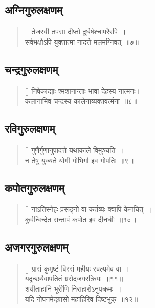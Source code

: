 \documentclass[twoside,12pt,notitlepage]{book}
\begin{document}
\subsection*{अग्निगुरुलक्षणम् }
\begin{verse}[\versewidth]
तेजस्वी तपसा दीप्तो दुर्धर्षश्चापरैरपि~।\\[-6pt]
सर्वभक्षोऽपि युक्तात्मा नादत्ते मलमग्निवत्~॥७॥\footA 
\end{verse}

\subsection*{चन्द्रगुरुलक्षणम्}
\begin{verse}[\versewidth]
निषेकाद्याः श्मशानान्ताः भावा देहस्य नात्मनः।\\[-6pt]
कलानामिव चन्द्रस्य कालेनाव्यक्तवर्त्मना~॥८॥\footA 
\end{verse}

\subsection*{रविगुरुलक्षणम् }
\begin{verse}[\versewidth]
गुणैर्गुणानुपादत्ते यथाकाले विमुञ्चति~।\\[-6pt]
न तेषु युज्यते योगी गोभिर्गा इव गोपतिः~॥९॥\footA
\end{verse}

\subsection*{कपोतगुरुलक्षणम् }
\begin{verse}[\versewidth]
नाऽतिस्नेहः प्रसङ्गो वा कर्तव्यः क्वापि केनचित्~।\\[-6pt]
कुर्वन्विन्देत  सन्तापं कपोत इव दीनधीः~॥१०॥\footA 
\end{verse}

\subsection*{अजगरगुरुलक्षणम् }
\begin{verse}[\versewidth]
ग्रासं कुमृष्टं विरसं महीयः स्वल्पमेव वा~।\\[-6pt]
यदृच्छयैवापतितं ग्रसेदजगरक्रियः~॥११॥\\
शयीताहानि भूरीणि निराहारोऽनुपक्रमः~।\\[-6pt]
यदि नोपनमेद्ग्रासो महाहिरिव दिष्टभुक्~॥१२॥\footA 
\end{verse}
\end{document}

